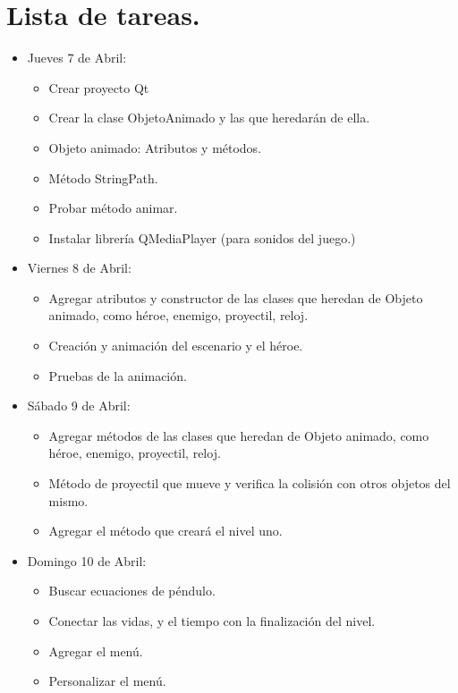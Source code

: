 \documentclass{article}
\begin{document}
\section{Lista de tareas.}
\begin{itemize}
    \item Jueves 7 de Abril:
    \begin{itemize}
        \item Crear proyecto Qt
        \item Crear la clase ObjetoAnimado y las que heredarán de ella.
        \item Objeto animado: Atributos y métodos.
        \item Método StringPath.
        \item Probar método animar.
        \item Instalar librería QMediaPlayer (para sonidos del juego.)
        
    \end{itemize}
    \item Viernes 8 de Abril:
    \begin{itemize}
        \item Agregar atributos y constructor de las clases que heredan de Objeto animado, como héroe, enemigo, proyectil, reloj.
        \item Creación y animación del escenario y el héroe.
        \item Pruebas de la animación.
    
    \end{itemize}
    
    \item Sábado 9 de Abril:
    \begin{itemize}
        \item Agregar métodos de las clases que heredan de Objeto animado, como héroe, enemigo, proyectil, reloj.
        \item Método de proyectil que mueve y verifica la colisión con otros objetos del mismo.
        \item Agregar el método que creará el nivel uno.
    \end{itemize}
    
    \item Domingo 10 de Abril:
    \begin{itemize}
        \item Buscar ecuaciones de péndulo.
        \item Conectar las vidas, y el tiempo con la finalización del nivel.
        \item Agregar el menú.
        \item Personalizar el menú.
    \end{itemize}
    

\end{itemize}
\end{document}
